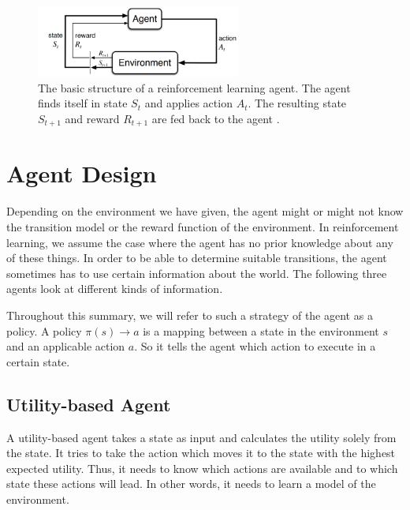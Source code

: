 \documentclass{llncs}
\begin{document}
\begin{figure}[H]
	\centering
	\includegraphics[width=0.6\textwidth]{figures/reinforcement_learning.PNG}
	\caption[caption]{The basic structure of a reinforcement learning agent. The agent finds itself in state $S_t$ and applies action $A_t$. The resulting state $S_{t+1}$ and reward $R_{t+1}$ are fed back to the agent \cite{Sutton}.}
	\label{fig:reinforcement_learning}
\end{figure}

\section{Agent Design}
Depending on the environment we have given, the agent might or might not know the transition model or the reward function of the environment. In reinforcement learning, we assume the case where the agent has no prior knowledge about any of these things. In order to be able to determine suitable transitions, the agent sometimes has to use certain information about the world. The following three agents look at different kinds of information.\par

Throughout this summary, we will refer to such a strategy of the agent as a policy. A policy $\pi(s)\rightarrow a$ is a mapping between a state in the environment $s$ and an applicable action $a$. So it tells the agent which action to execute in a certain state.


\subsection{Utility-based Agent}
A utility-based agent takes a state as input and calculates the utility solely from the state. It tries to take the action which moves it to the state with the highest expected utility. Thus, it needs to know which actions are available and to which state these actions will lead. In other words, it needs to learn a model of the environment.
\end{document}
